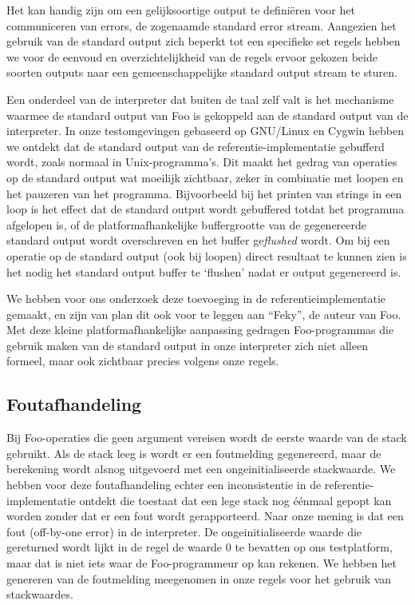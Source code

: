 \documentclass[11pt]{article}
\begin{document}
Het kan handig zijn om een gelijksoortige output te defini\"eren voor het communiceren van errors, de zogenaamde standard error stream.
Aangezien het gebruik van de standard output zich beperkt tot een specifieke set regels hebben we voor de eenvoud en overzichtelijkheid van de regels ervoor gekozen beide soorten outputs naar een gemeenschappelijke standard output stream te sturen.

Een onderdeel van de interpreter dat buiten de taal zelf valt is het mechanisme waarmee de standard output van Foo is gekoppeld aan de standard output van de interpreter.
In onze testomgevingen gebaseerd op GNU/Linux en Cygwin hebben we ontdekt dat de standard output van de referentie-implementatie gebufferd wordt, zoals normaal in Unix-programma's.
Dit maakt het gedrag van operaties op de standard output wat moeilijk zichtbaar, zeker in combinatie met loopen en het pauzeren van het programma.
Bijvoorbeeld bij het printen van strings in een loop is het effect dat de standard output wordt gebuffered totdat het programma afgelopen is, of de platformafhankelijke buffergrootte van de gegenereerde standard output wordt overschreven en het buffer ge\textit{flushed} wordt.
Om bij een operatie op de standard output (ook bij loopen) direct resultaat te kunnen zien is het nodig het standard output buffer te `flushen' nadat er output gegenereerd is.

We hebben voor ons onderzoek deze toevoeging in de referentieimplementatie gemaakt, en zijn van plan dit ook voor te leggen aan ``Feky'', de auteur van Foo.
Met deze kleine platformafhankelijke aanpassing gedragen Foo-programmas die gebruik maken van de standard output in onze interpreter zich niet alleen formeel, maar ook zichtbaar precies volgens onze regels.


\subsection{Foutafhandeling} 
Bij Foo-operaties die geen argument vereisen wordt de eerste waarde van de stack gebruikt. 
Als de stack leeg is wordt er een foutmelding gegenereerd, maar de berekening wordt alsnog uitgevoerd met een ongeinitialiseerde stackwaarde.
We hebben voor deze foutafhandeling echter een inconsistentie in de referentie-implementatie ontdekt die toestaat dat een lege stack nog \'e\'enmaal gepopt kan worden zonder dat er een fout wordt gerapporteerd.
Naar onze mening is dat een fout (off-by-one error) in de interpreter.
De ongeinitialiseerde waarde die gereturned wordt lijkt in de regel de waarde 0 te bevatten op ons testplatform, maar dat is niet iets waar de Foo-programmeur op kan rekenen.
We hebben het genereren van de foutmelding meegenomen in onze regels voor het gebruik van stackwaardes.
\end{document}
